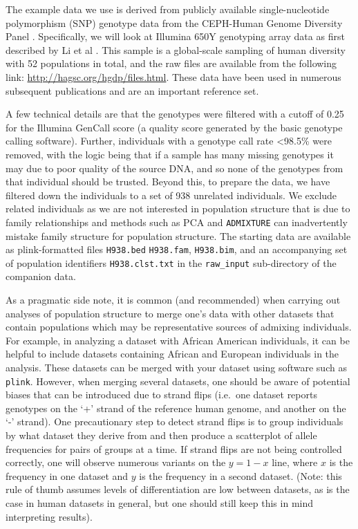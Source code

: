 \documentclass{svmult}       %
\begin{document}
The example data we use is derived from publicly available
single-nucleotide polymorphism (SNP) genotype data from the CEPH-Human
Genome Diversity Panel \cite{Cann02}. Specifically, we will look at
Illumina 650Y genotyping array data as first described by Li et al \cite{Li08}.
This sample is a global-scale sampling of human diversity
with 52 populations in total, and the raw files are available from the
following link: \url{http://hagsc.org/hgdp/files.html}. These data have
been used in numerous subsequent publications and are an important
reference set.

A few technical details are that the genotypes were filtered with a
cutoff of 0.25 for the Illumina GenCall score \cite{GenCall} (a quality
score generated by the basic genotype calling software). Further,
individuals with a genotype call rate \textless{}98.5\% were removed,
with the logic being that if a sample has many missing genotypes it may
due to poor quality of the source DNA, and so none of the genotypes from
that individual should be trusted. Beyond this, to prepare the data, we
have filtered down the individuals to a set of 938 unrelated
individuals. We exclude related individuals as we are not interested in
population structure that is due to family relationships and methods
such as PCA and \texttt{ADMIXTURE} can inadvertently mistake family
structure for population structure. The starting data are available as
plink-formatted files \texttt{H938.bed} \texttt{H938.fam},
\texttt{H938.bim}, and an accompanying set of population identifiers
\texttt{H938.clst.txt} in the \texttt{raw\_input} sub-directory of the companion data.

As a pragmatic side note, it is common (and recommended) when carrying
out analyses of population structure to merge one's data with other
datasets that contain populations which may be representative sources of
admixing individuals. For example, in analyzing a dataset with African
American individuals, it can be helpful to include datasets containing
African and European individuals in the analysis. These datasets can be
merged with your dataset using software such as \texttt{plink}. However,
when merging several datasets, one should be aware of potential biases
that can be introduced due to strand flips (i.e.~one dataset reports
genotypes on the `+' strand of the reference human genome, and another
on the `-' strand). One precautionary step to detect strand flips is to
group individuals by what dataset they derive from and then produce a
scatterplot of allele frequencies for pairs of groups at a time. If
strand flips are not being controlled correctly, one will observe
numerous variants on the \(y=1-x\) line, where \(x\) is the frequency in
one dataset and \(y\) is the frequency in a second dataset. (Note: this
rule of thumb assumes levels of differentiation are low between
datasets, as is the case in human datasets in general, but one should
still keep this in mind interpreting results).
\end{document}

